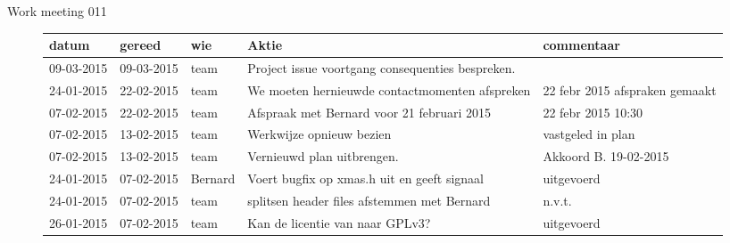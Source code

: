 \documentclass[a4paper,final]{article}
\begin{document}
\begin{Minutes}{Work meeting 011}
\vspace{2em}

\begin{figure}[p]
\begin{tabular}{|l|l|l|p{10em}|p{10em}|}
\hline
{\bf datum} & {\bf gereed} & {\bf wie} & {\bf Aktie}                                      & commentaar      \\\hline
09-03-2015  & 09-03-2015   & team      & Project issue voortgang consequenties bespreken. &     \\\hline
24-01-2015  & 22-02-2015   & team      & We moeten hernieuwde contactmomenten afspreken   & 22 febr 2015 afspraken gemaakt\\\hline
07-02-2015  & 22-02-2015   & team      & Afspraak met Bernard voor 21 februari 2015       & 22 febr 2015 10:30\\\hline
07-02-2015  & 13-02-2015   & team      & Werkwijze opnieuw bezien                         & vastgeled in plan\\\hline
07-02-2015  & 13-02-2015   & team      & Vernieuwd plan uitbrengen.                       & Akkoord B. 19-02-2015\\\hline
24-01-2015  & 07-02-2015   & Bernard   & Voert bugfix op xmas.h uit en geeft signaal      & uitgevoerd\\\hline
24-01-2015  & 07-02-2015   & team      & splitsen header files afstemmen met Bernard      & n.v.t.\\\hline
26-01-2015  & 07-02-2015   & team      & Kan de licentie van \w{bitpower lib} naar GPLv3? & uitgevoerd\\\hline
\end{tabular}
\end{figure}

\end{Minutes}
\end{document}
